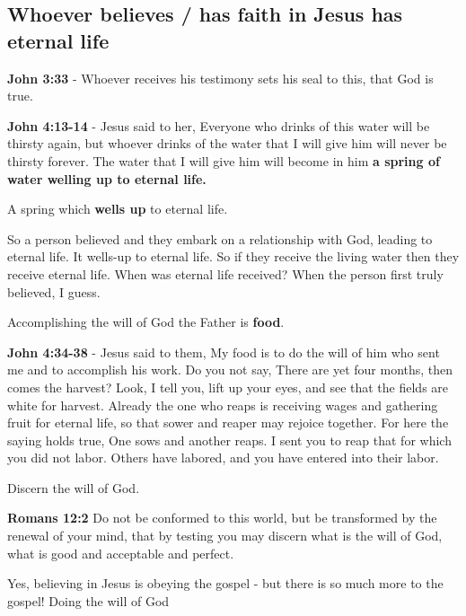 \documentclass[11pt]{article}
\begin{document}
\subsection{Whoever believes / has faith in Jesus has eternal life}
\label{sec:org686828a}
\textbf{John 3:33} - Whoever receives his testimony sets his seal to this, that God is true.

\textbf{John 4:13-14} - Jesus said to her, Everyone who drinks of this water will be thirsty again, but whoever drinks of the water that I will give him will never be thirsty forever. The water that I will give him will become in him \textbf{a spring of water welling up to eternal life.}

A spring which \textbf{wells up} to eternal life.

So a person believed and they embark on a relationship with God, leading to eternal life.
It wells-up to eternal life. So if they receive the living water then they receive eternal life.
When was eternal life received? When the person first truly believed, I guess.

Accomplishing the will of God the Father is \textbf{food}.

\textbf{John 4:34-38} - Jesus said to them, My food is to do the will of him who sent me and to accomplish his work. Do you not say, There are yet four months, then comes the harvest? Look, I tell you, lift up your eyes, and see that the fields are white for harvest. Already the one who reaps is receiving wages and gathering fruit for eternal life, so that sower and reaper may rejoice together. For here the saying holds true, One sows and another reaps. I sent you to reap that for which you did not labor. Others have labored, and you have entered into their labor.

Discern the will of God.

\textbf{Romans 12:2} Do not be conformed to this world, but be transformed by the renewal of your mind, that by testing you may discern what is the will of God, what is good and acceptable and perfect.

Yes, believing in Jesus is obeying the gospel - but there is so much more to the gospel! Doing the will of God
\end{document}
